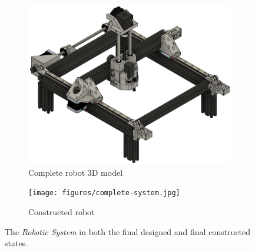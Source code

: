 \begin{figure}[!ht]
	\centering
	\begin{subfigure}{.55\textwidth}
		\centering
	\includegraphics[width=1\linewidth]{figures/final-assembly.png}
	\caption{Complete robot 3D model}
	\label{fig:final-assembly}
	\end{subfigure}%
	\begin{subfigure}{.44\textwidth}
		\centering
	\texttt{[image: figures/complete-system.jpg]}
	\caption{Constructed robot}
	\label{fig:final-robot}
	\end{subfigure}%
	\caption{The \textit{Robotic System} in both the final designed and final constructed states.}
	\label{fig:x}
\end{figure}

